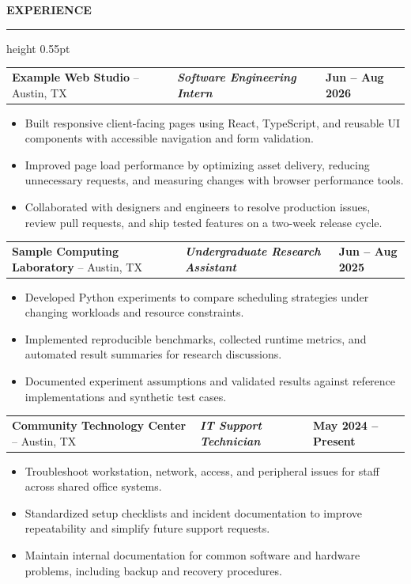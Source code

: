 \documentclass[10pt,letterpaper]{article}
\makeatletter
\newcommand{\ressection}[1]{%
  \vspace{1.8pt}%
  {\fontsize{11.1}{11.9}\selectfont\bfseries\MakeUppercase{#1}}\par
  \vspace{0.35pt}\hrule height 0.55pt\vspace{3.0pt}%
}
\newcommand{\expline}[4]{%
  {\fontsize{10.1}{11.25}\selectfont
  \begin{tabularx}{\textwidth}{@{}X >{\centering\arraybackslash\itshape\bfseries}p{0.32\textwidth} >{\raggedleft\arraybackslash\bfseries}p{0.205\textwidth}@{}}
    \textbf{#1} -- #2 & #3 & #4
  \end{tabularx}}\vspace{-0.3pt}%
}
\newenvironment{resitems}{%
  \begin{itemize}[leftmargin=18pt,labelindent=0pt,labelsep=11.5pt,labelwidth=6pt,align=left,
                  itemsep=0.42pt,topsep=0.38pt,parsep=0pt,partopsep=0pt]
  \fontsize{10.05}{12.0}\selectfont\RaggedRight
}{\end{itemize}\vspace{0.48pt}}
\makeatother
\begin{document}
\ressection{Experience}
\expline{Example Web Studio}{Austin, TX}{Software Engineering Intern}{Jun -- Aug 2026}
\begin{resitems}
\item Built responsive client-facing pages using React, TypeScript, and reusable UI components with accessible navigation and form validation.
\item Improved page load performance by optimizing asset delivery, reducing unnecessary requests, and measuring changes with browser performance tools.
\item Collaborated with designers and engineers to resolve production issues, review pull requests, and ship tested features on a two-week release cycle.
\end{resitems}
\expline{Sample Computing Laboratory}{Austin, TX}{Undergraduate Research Assistant}{Jun -- Aug 2025}
\begin{resitems}
\item Developed Python experiments to compare scheduling strategies under changing workloads and resource constraints.
\item Implemented reproducible benchmarks, collected runtime metrics, and automated result summaries for research discussions.
\item Documented experiment assumptions and validated results against reference implementations and synthetic test cases.
\end{resitems}
\expline{Community Technology Center}{Austin, TX}{IT Support Technician}{May 2024 -- Present}
\begin{resitems}
\item Troubleshoot workstation, network, access, and peripheral issues for staff across shared office systems.
\item Standardized setup checklists and incident documentation to improve repeatability and simplify future support requests.
\item Maintain internal documentation for common software and hardware problems, including backup and recovery procedures.
\end{resitems}
\end{document}
